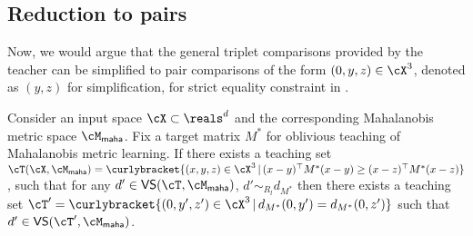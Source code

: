
\subsection{Reduction to pairs}
Now, we would argue that the general triplet comparisons provided by the teacher can be simplified to pair comparisons of the form $(0, y,z) \in \cX^3$, denoted as $(y,z)$ for simplification, for strict equality constraint in . 


\begin{lemma}\label{lem: reduction}
    Consider an input space $\cX \subset \reals^d$ and the corresponding Mahalanobis metric space $\cM_{\textsf{maha}}$. Fix a target matrix $M^*$ for oblivious teaching of Mahalanobis metric learning. If there exists a teaching set $\cT(\cX, \cM_{\textsf{maha}}) = \curlybracket{(x,y,z) \in \cX^3 \,|\, (x-y)^{\top}M^*(x-y) \ge (x-z)^{\top}M^*(x-z)} $, such that for any $d' \in \textsf{VS}(\cT, \cM_{\textsf{maha}})$, $d' \sim_{R_l} d_{M^*}$ then there exists a teaching set $\cT' = \curlybracket{(0,y',z') \in\cX^3\,|\, d_{M^*}(0, y') = d_{M^*}(0, z')}$ such that $d' \in \textsf{VS}(\cT',\cM_{\textsf{maha}})$.
\end{lemma}

